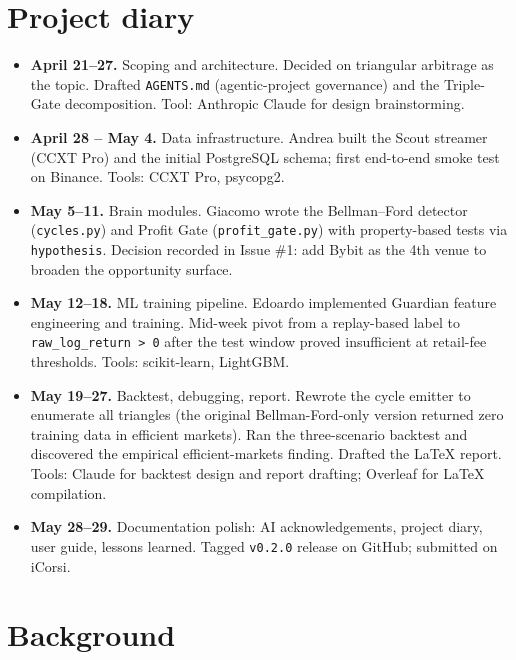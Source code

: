 \documentclass[11pt,a4paper]{article}
\begin{document}
\section{Project diary}
\label{sec:diary}

\begin{itemize}[leftmargin=*, itemsep=0pt]
    \item \textbf{April 21--27.} Scoping and architecture. Decided on triangular arbitrage as the topic. Drafted \texttt{AGENTS.md} (agentic-project governance) and the Triple-Gate decomposition. Tool: Anthropic Claude for design brainstorming.
    \item \textbf{April 28 -- May 4.} Data infrastructure. Andrea built the Scout streamer (CCXT Pro) and the initial PostgreSQL schema; first end-to-end smoke test on Binance. Tools: CCXT Pro, psycopg2.
    \item \textbf{May 5--11.} Brain modules. Giacomo wrote the Bellman--Ford detector (\texttt{cycles.py}) and Profit Gate (\texttt{profit\_gate.py}) with property-based tests via \texttt{hypothesis}. Decision recorded in Issue \#1: add Bybit as the 4th venue to broaden the opportunity surface.
    \item \textbf{May 12--18.} ML training pipeline. Edoardo implemented Guardian feature engineering and training. Mid-week pivot from a replay-based label to \texttt{raw\_log\_return > 0} after the test window proved insufficient at retail-fee thresholds. Tools: scikit-learn, LightGBM.
    \item \textbf{May 19--27.} Backtest, debugging, report. Rewrote the cycle emitter to enumerate all triangles (the original Bellman-Ford-only version returned zero training data in efficient markets). Ran the three-scenario backtest and discovered the empirical efficient-markets finding. Drafted the LaTeX report. Tools: Claude for backtest design and report drafting; Overleaf for LaTeX compilation.
    \item \textbf{May 28--29.} Documentation polish: AI acknowledgements, project diary, user guide, lessons learned. Tagged \texttt{v0.2.0} release on GitHub; submitted on iCorsi.
\end{itemize}

\section{Background}
\label{sec:background}
\end{document}
